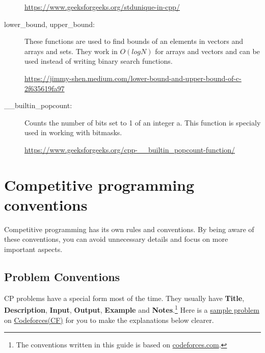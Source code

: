 \documentclass[12pt, a4paper]{article}
\begin{document}
\begin{description}
\url{https://www.geeksforgeeks.org/stdunique-in-cpp/}
\item[lower\_bound, upper\_bound:] These functions are used to find bounds of an elements in vectors and arrays and sets. They work in $O(logN)$ for arrays and vectors and can be used instead of writing binary search functions.

\url{https://jimmy-shen.medium.com/lower-bound-and-upper-bound-of-c-2f635619fa97}
\item[\_\_builtin\_popcount:] Counts the number of bits set to 1 of an integer a. This function is specialy used in working with bitmasks.

\url{https://www.geeksforgeeks.org/cpp-__builtin_popcount-function/}
\end{description}

\section{Competitive programming conventions}
Competitive programming has its own rules and conventions. By being aware of these conventions, you can avoid unnecessary details and focus on more important aspects.
\subsection{Problem Conventions}
CP problems have a special form most of the time. They usually have \textbf{Title}, \textbf{Description}, \textbf{Input}, \textbf{Output}, \textbf{Example} and \textbf{Notes}.\footnote{The conventions written in this guide is based on \href{https://codeforces.com/}{codeforces.com}.} Here is a \href{https://codeforces.com/contest/1767/problem/B}{sample problem} on \href{https://codeforces.com/}{Codeforces(CF)} for you to make the explanations below clearer.
\end{document}
